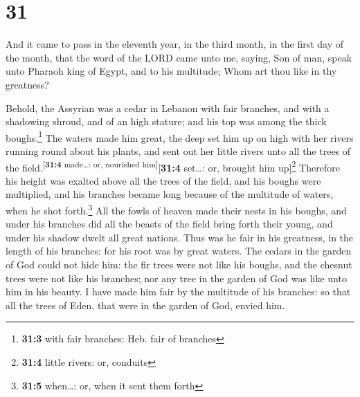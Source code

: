 \hypertarget{section-30}{%
\section{31}\label{section-30}}

 And it came to pass in the eleventh year, in the third
month, in the first day of the month, that the word of the LORD came
unto me, saying,  Son of man, speak unto Pharaoh king of
Egypt, and to his multitude; Whom art thou like in thy greatness?

 Behold, the Assyrian was a cedar in Lebanon with fair
branches, and with a shadowing shroud, and of an high stature; and his
top was among the thick boughs.\footnote{\textbf{31:3} with fair
  branches: Heb. fair of branches}  The waters made him
great, the deep set him up on high with her rivers running round about
his plants, and sent out her little rivers unto all the trees of the
field.\textsuperscript{{[}\textbf{31:4} made\ldots: or, nourished
him{]}}{[}\textbf{31:4} set\ldots: or, brought him up{]}\footnote{\textbf{31:4}
  little rivers: or, conduits}  Therefore his height was
exalted above all the trees of the field, and his boughs were
multiplied, and his branches became long because of the multitude of
waters, when he shot forth.\footnote{\textbf{31:5} when\ldots: or, when
  it sent them forth}  All the fowls of heaven made their
nests in his boughs, and under his branches did all the beasts of the
field bring forth their young, and under his shadow dwelt all great
nations.  Thus was he fair in his greatness, in the length
of his branches: for his root was by great waters.  The
cedars in the garden of God could not hide him: the fir trees were not
like his boughs, and the chesnut trees were not like his branches; nor
any tree in the garden of God was like unto him in his beauty.
 I have made him fair by the multitude of his branches: so
that all the trees of Eden, that were in the garden of God, envied him.

